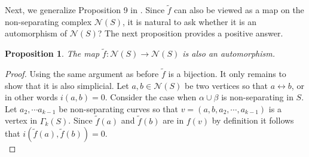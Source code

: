 \documentclass[11pt]{article}
\def\lr{\leftrightarrow}
\def\a{\alpha}
\def\b{\beta}
\newtheorem{proposition}[theorem]{Proposition}
\begin{document}
Next, we generalize Proposition 9 in \cite{irmak2004}. Since $\tilde{f}$ can also be viewed as a map on the non-separating complex $ \mathcal{N}(S)$, it is natural to ask whether it is an automorphism of $ \mathcal{N}(S)$? The next proposition provides a positive answer.
\begin{proposition}
  The map $\tilde{f}: \mathcal{N}(S)\to \mathcal{N}(S)$ is also an automorphism.
\end{proposition}
\begin{proof}
  Using the same argument as before $\tilde{f}$ is a bijection. It only remains to show that it is also simplicial. Let $a,b\in \mathcal{N}(S)$ be two vertices so that $a\lr b$, or in other words $i(a,b)=0$. Consider the case when $\a\cup \b$ is non-separating in $S$. Let $a_2, \cdots a_{k-1}$ be non-separating curves so that $v = (a,b,a_2,\cdots, a_{k-1})$ is a vertex in $\Gamma_k(S)$. Since $\tilde{f}(a)$ and $\tilde{f}(b)$ are in $f(v)$ by definition it follows that $i(\tilde{f}(a), \tilde{f}(b)) = 0$.\\


\end{proof}
\end{document}
